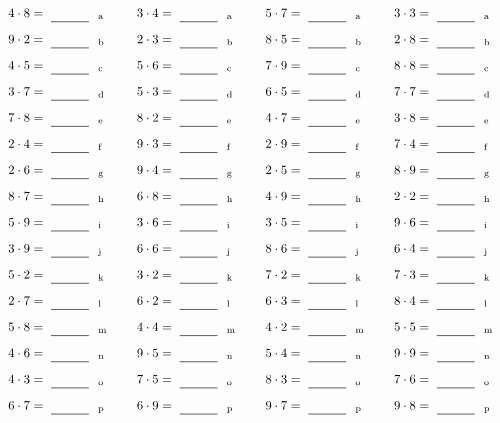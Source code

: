 \documentclass
[
  draft    = true,
  fontsize = 11pt,
  parskip  = half-
]
{scrartcl}
\begin{document}
\par\vfill\par
\begin{align*}
    \pline{4\cdot8}&=\rline{a}
  & \pline{3\cdot4}&=\rline{a}
  & \pline{5\cdot7}&=\rline{a}
  & \pline{3\cdot3}&=\rline{a} \\[1ex]
    \pline{9\cdot2}&=\rline{b}
  & \pline{2\cdot3}&=\rline{b}
  & \pline{8\cdot5}&=\rline{b}
  & \pline{2\cdot8}&=\rline{b} \\[1ex]
    \pline{4\cdot5}&=\rline{c}
  & \pline{5\cdot6}&=\rline{c}
  & \pline{7\cdot9}&=\rline{c}
  & \pline{8\cdot8}&=\rline{c} \\[1ex]
    \pline{3\cdot7}&=\rline{d}
  & \pline{5\cdot3}&=\rline{d}
  & \pline{6\cdot5}&=\rline{d}
  & \pline{7\cdot7}&=\rline{d} \\[1ex]
    \pline{7\cdot8}&=\rline{e}
  & \pline{8\cdot2}&=\rline{e}
  & \pline{4\cdot7}&=\rline{e}
  & \pline{3\cdot8}&=\rline{e} \\[1ex]
    \pline{2\cdot4}&=\rline{f}
  & \pline{9\cdot3}&=\rline{f}
  & \pline{2\cdot9}&=\rline{f}
  & \pline{7\cdot4}&=\rline{f} \\[1ex]
    \pline{2\cdot6}&=\rline{g}
  & \pline{9\cdot4}&=\rline{g}
  & \pline{2\cdot5}&=\rline{g}
  & \pline{8\cdot9}&=\rline{g} \\[1ex]
    \pline{8\cdot7}&=\rline{h}
  & \pline{6\cdot8}&=\rline{h}
  & \pline{4\cdot9}&=\rline{h}
  & \pline{2\cdot2}&=\rline{h} \\[1ex]
    \pline{5\cdot9}&=\rline{i}
  & \pline{3\cdot6}&=\rline{i}
  & \pline{3\cdot5}&=\rline{i}
  & \pline{9\cdot6}&=\rline{i} \\[1ex]
    \pline{3\cdot9}&=\rline{j}
  & \pline{6\cdot6}&=\rline{j}
  & \pline{8\cdot6}&=\rline{j}
  & \pline{6\cdot4}&=\rline{j} \\[1ex]
    \pline{5\cdot2}&=\rline{k}
  & \pline{3\cdot2}&=\rline{k}
  & \pline{7\cdot2}&=\rline{k}
  & \pline{7\cdot3}&=\rline{k} \\[1ex]
    \pline{2\cdot7}&=\rline{l}
  & \pline{6\cdot2}&=\rline{l}
  & \pline{6\cdot3}&=\rline{l}
  & \pline{8\cdot4}&=\rline{l} \\[1ex]
    \pline{5\cdot8}&=\rline{m}
  & \pline{4\cdot4}&=\rline{m}
  & \pline{4\cdot2}&=\rline{m}
  & \pline{5\cdot5}&=\rline{m} \\[1ex]
    \pline{4\cdot6}&=\rline{n}
  & \pline{9\cdot5}&=\rline{n}
  & \pline{5\cdot4}&=\rline{n}
  & \pline{9\cdot9}&=\rline{n} \\[1ex]
    \pline{4\cdot3}&=\rline{o}
  & \pline{7\cdot5}&=\rline{o}
  & \pline{8\cdot3}&=\rline{o}
  & \pline{7\cdot6}&=\rline{o} \\[1ex]
    \pline{6\cdot7}&=\rline{p}
  & \pline{6\cdot9}&=\rline{p}
  & \pline{9\cdot7}&=\rline{p}
  & \pline{9\cdot8}&=\rline{p}
\end{align*}
\end{document}
